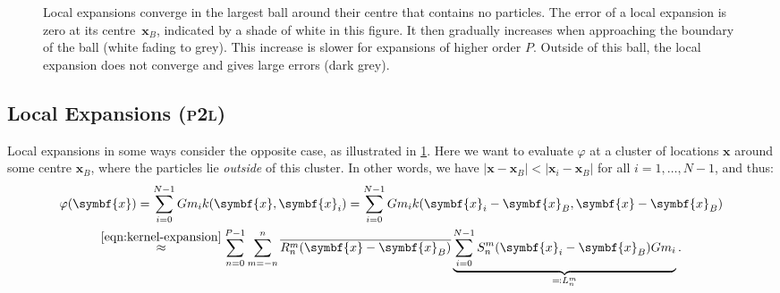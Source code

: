 \documentclass{scrbook}
\newcommand{\PtoL}{\textsc{p2l}}
\newcommand{\vv}[1]{\ensuremath{\symbf{#1}}} %
\begin{document}
\begin{figure}
\centering
{}
\caption{\label{fig:local-expansion}Local expansions converge in the largest
ball around their centre that contains no particles. The error of a local
expansion is zero at its centre~$\vv{x}_B$, indicated by a shade of white in
this figure. It then gradually increases when approaching the boundary of the
ball (white fading to grey). This increase is slower for expansions of higher
order $P$. Outside of this ball, the local expansion does not converge and
gives large errors (dark grey).}
\end{figure}

\subsection{Local Expansions (\PtoL)}
Local expansions in some ways consider the opposite case, as illustrated in
\cref{fig:local-expansion}. Here we want to evaluate $\varphi$ at a cluster of
locations $\vv{x}$ around some centre $\vv{x}_B$, where the particles lie
\emph{outside} of this cluster. In other words, we have $|\vv{x}-\vv{x}_B| <
|\vv{x}_i-\vv{x}_B|$ for all $i=1,\dotsc,N-1$, and thus:
\begin{multline}
\varphi(\vv{x})
= \sum_{i=0}^{N-1}Gm_i k(\vv{x},\vv{x}_i)
= \sum_{i=0}^{N-1}Gm_i k(\vv{x}_i-\vv{x}_B,\vv{x}-\vv{x}_B) \\
\stackrel{\eqref{eqn:kernel-expansion}}{\approx}
\sum_{n=0}^{P-1}\sum_{m=-n\vphantom{0}}^n
\overline{R_n^m(\vv{x}-\vv{x}_B)}
\underbrace{\sum_{i=0}^{N-1}S_n^m(\vv{x}_i-\vv{x}_B)Gm_i}_{\eqqcolon L_n^m}.
\end{multline}
\end{document}
